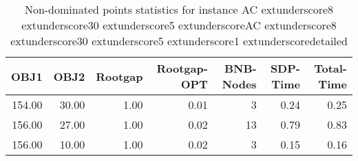 \begin{table}
\caption{Non-dominated points statistics for instance AC	extunderscore8	extunderscore30	extunderscore5	extunderscoreAC	extunderscore8	extunderscore30	extunderscore5	extunderscore1	extunderscoredetailed}
\label{tab:stats/AC_8_30_5_AC_8_30_5_1_detailed}
\begin{tabular}{rrrrrrr}
\toprule
OBJ1 & OBJ2 & Rootgap & Rootgap-OPT & BNB-Nodes & SDP-Time & Total-Time \\
\midrule
154.00 & 30.00 & 1.00 & 0.01 & 3 & 0.24 & 0.25 \\
156.00 & 27.00 & 1.00 & 0.02 & 13 & 0.79 & 0.83 \\
156.00 & 10.00 & 1.00 & 0.02 & 3 & 0.15 & 0.16 \\
\bottomrule
\end{tabular}
\end{table}
